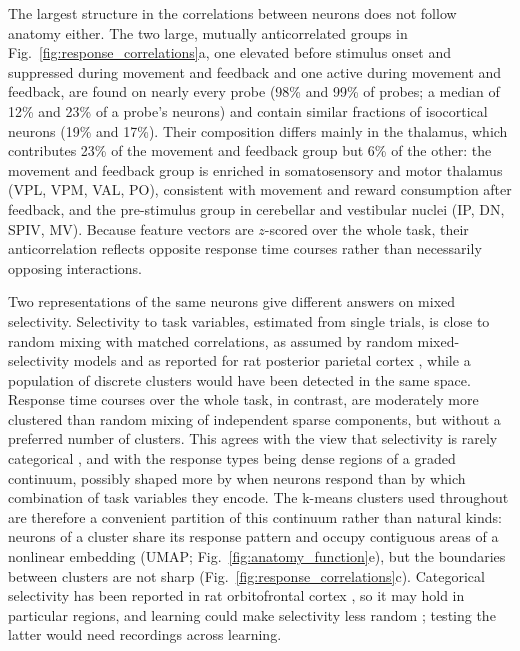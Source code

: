 \documentclass[10pt,lineno]{elife}
\begin{document}
The largest structure in the correlations between neurons does not follow anatomy either. The two large, mutually anticorrelated groups in Fig.~\ref{fig:response_correlations}a, one elevated before stimulus onset and suppressed during movement and feedback and one active during movement and feedback, are found on nearly every probe (98\% and 99\% of probes; a median of 12\% and 23\% of a probe's neurons) and contain similar fractions of isocortical neurons (19\% and 17\%). Their composition differs mainly in the thalamus, which contributes 23\% of the movement and feedback group but 6\% of the other: the movement and feedback group is enriched in somatosensory and motor thalamus (VPL, VPM, VAL, PO), consistent with movement and reward consumption after feedback, and the pre-stimulus group in cerebellar and vestibular nuclei (IP, DN, SPIV, MV). Because feature vectors are $z$-scored over the whole task, their anticorrelation reflects opposite response time courses rather than necessarily opposing interactions.

Two representations of the same neurons give different answers on mixed selectivity. Selectivity to task variables, estimated from single trials, is close to random mixing with matched correlations, as assumed by random mixed-selectivity models \cite{rigotti2013importance, fusi2016neurons} and as reported for rat posterior parietal cortex \cite{raposo2014category}, while a population of discrete clusters would have been detected in the same space. Response time courses over the whole task, in contrast, are moderately more clustered than random mixing of independent sparse components, but without a preferred number of clusters. This agrees with the view that selectivity is rarely categorical \cite{posani2026rarely}, and with the response types being dense regions of a graded continuum, possibly shaped more by when neurons respond than by which combination of task variables they encode. The k-means clusters used throughout are therefore a convenient partition of this continuum rather than natural kinds: neurons of a cluster share its response pattern and occupy contiguous areas of a nonlinear embedding (UMAP; Fig.~\ref{fig:anatomy_function}e), but the boundaries between clusters are not sharp (Fig.~\ref{fig:response_correlations}c). Categorical selectivity has been reported in rat orbitofrontal cortex \cite{hirokawa2019frontal}, so it may hold in particular regions, and learning could make selectivity less random \cite{lindsay2017hebbian}; testing the latter would need recordings across learning.
\end{document}
